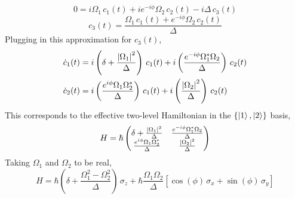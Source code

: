 \documentclass[10pt]{article}
\begin{document}
\begin{equation}
    0 = i\Omega_1\,c_1(t) + ie^{-i\phi}\Omega_2\,c_2(t) - i\Delta\,c_3(t)
\end{equation}
\begin{equation}
    c_3(t) = \frac{\Omega_1\,c_1(t) + e^{-i\phi}\Omega_2\,c_2(t)}{\Delta}
\end{equation}
Plugging in this approximation for $c_3(t)$,
\begin{align}
    \dot{c}_1(t) &= i\left(\delta + \frac{\abs{\Omega_1}^2}{\Delta}\right)\,c_1(t) + i\left(\frac{e^{-i\phi}\Omega_1^*\Omega_2}{\Delta}\right)\,c_2(t) \\
    \dot{c}_2(t) &= i\left( \frac{e^{i\phi}\Omega_1\Omega_2^*}{\Delta} \right)\,c_1(t) + i\left( \frac{\abs{\Omega_2}^2}{\Delta} \right)\,c_2(t)
\end{align}
This corresponds to the effective two-level Hamiltonian in the $\{\ket{1}, \ket{2}\}$ basis,
\begin{equation}
    H = 
    \hbar
    \begin{pmatrix}
        \delta + \frac{\abs{\Omega_1}^2}{\Delta} & \frac{e^{-i\phi}\Omega_1^*\Omega_2}{\Delta} \\
        \frac{e^{i\phi}\Omega_1\Omega_2^*}{\Delta} & \frac{\abs{\Omega_2}^2}{\Delta}
    \end{pmatrix}
\end{equation}
Taking $\Omega_1$ and $\Omega_2$ to be real,
\begin{equation}
    H =  \hbar\left(\delta + \frac{\Omega_1^2 - \Omega_2^2}{\Delta}\right)\,\sigma_z + \hbar\frac{\Omega_1\Omega_2}{\Delta}\left[\cos(\phi)\,\sigma_x + \sin(\phi)\,\sigma_y\right]
\end{equation}
\end{document}
